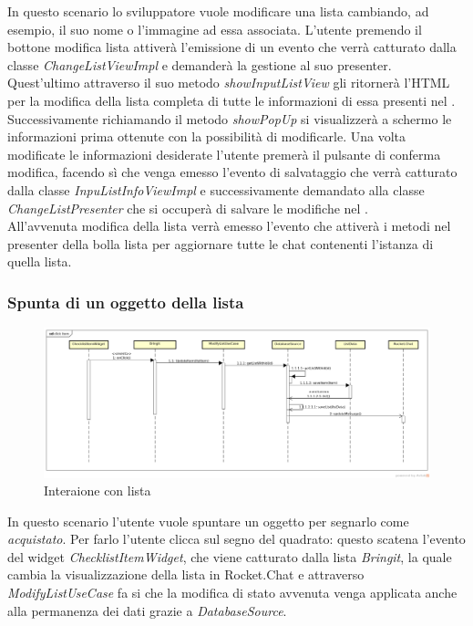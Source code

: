 In questo scenario lo sviluppatore vuole modificare una lista cambiando, ad esempio, il suo nome o l'immagine ad essa associata. L'utente premendo il bottone modifica lista attiverà l'emissione di un evento che verrà catturato dalla classe \textit{ChangeListViewImpl} e demanderà la  gestione al suo presenter. Quest'ultimo attraverso il suo  metodo \textit{showInputListView} gli ritornerà l'HTML per la modifica della lista completa di tutte le informazioni di essa presenti nel . Successivamente richiamando il metodo \textit{showPopUp} si visualizzerà a schermo  le informazioni prima ottenute con la possibilità di modificarle. Una volta modificate le informazioni desiderate l'utente premerà il pulsante di conferma modifica, facendo sì che venga emesso l'evento di salvataggio che verrà catturato dalla classe \textit{InpuListInfoViewImpl} e successivamente demandato alla classe \textit{ChangeListPresenter} che si occuperà di salvare le modifiche nel . \\
All'avvenuta modifica della lista  verrà emesso l'evento che attiverà i metodi nel presenter della bolla lista per aggiornare tutte le chat contenenti l'istanza di quella lista.
 
\subsubsection{Spunta di un oggetto della lista}

\label{Spunta di un oggetto della lista}
\begin{figure}[H]
	\centering
	\includegraphics[width=\textwidth]{Sezioni/Diagrammi/App/clickitem.png}
	\caption{Interaione con lista}
\end{figure}

In questo scenario l'utente vuole spuntare un oggetto per segnarlo come \textit{acquistato}.
Per farlo l'utente clicca sul segno del quadrato: questo scatena l'evento del widget \textit{ChecklistItemWidget}, che viene catturato dalla lista \textit{Bringit}, la quale cambia la visualizzazione della lista in Rocket.Chat e attraverso \textit{ModifyListUseCase} fa si che la modifica di stato avvenuta venga applicata anche alla permanenza dei dati grazie a \textit{DatabaseSource}.



